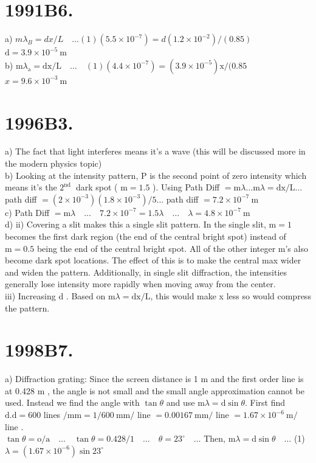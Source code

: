 \begin{enumerate}
\section*{1991B6.}
a) $m \lambda_{B}=d x / L \quad \ldots(1)\left(5.5 \times 10^{-7}\right)=d\left(1.2 \times 10^{-2}\right) /(0.85)$\\
$\mathrm{d}=3.9 \times 10^{-5} \mathrm{~m}$\\
b) $\mathrm{m} \lambda_{\mathrm{a}}=\mathrm{dx} / \mathrm{L} \quad \ldots \quad(1)\left(4.4 \times 10^{-7}\right)=\left(3.9 \times 10^{-5}\right) \mathrm{x} /(0.85$\\
$x=9.6 \times 10^{-3} \mathrm{~m}$

\section*{1996B3.}
a) The fact that light interferes means it's a wave (this will be discussed more in the modern physics topic)\\
b) Looking at the intensity pattern, P is the second point of zero intensity which means it's the $2^{\text {nd }}$ dark spot ( $\mathrm{m}=1.5$ ). Using Path Diff $=\mathrm{m} \lambda \ldots \mathrm{m} \lambda=\mathrm{dx} / \mathrm{L} \ldots$ path diff $=\left(2 \times 10^{-3}\right)\left(1.8 \times 10^{-3}\right) / 5 \ldots$ path diff $=7.2 \times 10^{-7} \mathrm{~m}$\\
c) Path Diff $=\mathrm{m} \lambda \quad \ldots \quad 7.2 \times 10^{-7}=1.5 \lambda \quad \ldots \quad \lambda=4.8 \times 10^{-7} \mathrm{~m}$\\
d) ii) Covering a slit makes this a single slit pattern. In the single slit, $\mathrm{m}=1$ becomes the first dark region (the end of the central bright spot) instead of $\mathrm{m}=0.5$ being the end of the central bright spot. All of the other integer m's also become dark spot locations. The effect of this is to make the central max wider and widen the pattern. Additionally, in single slit diffraction, the intensities generally lose intensity more rapidly when moving away from the center.\\
iii) Increasing d . Based on $\mathrm{m} \lambda=\mathrm{dx} / \mathrm{L}$, this would make x less so would compress the pattern.

\section*{1998B7.}
a) Diffraction grating: Since the screen distance is 1 m and the first order line is at 0.428 m , the angle is not small and the small angle approximation cannot be used. Instead we find the angle with $\tan \theta$ and use $\mathrm{m} \lambda=\mathrm{d} \sin \theta$. First find $\mathrm{d} . \mathrm{d}=600$ lines $/ \mathrm{mm}=1 / 600 \mathrm{~mm} /$ line $=0.00167 \mathrm{~mm} /$ line $=1.67 \times 10^{-6} \mathrm{~m} /$ line .\\
$\tan \theta=\mathrm{o} / \mathrm{a} \quad \ldots \quad \tan \theta=0.428 / 1 \quad \ldots \quad \theta=23^{\circ} \quad \ldots$ Then, $\mathrm{m} \lambda=\mathrm{d} \sin \theta \quad \ldots$ (1) $\lambda=\left(1.67 \times 10^{-6}\right) \sin 23^{\circ}$


\end{enumerate}
